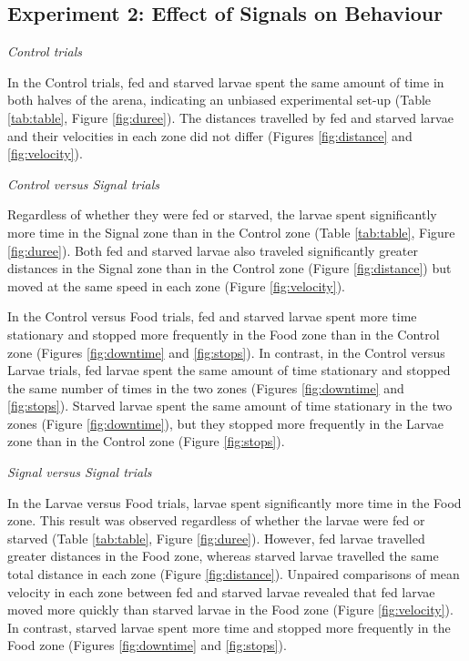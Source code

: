 
\subsection{Experiment 2: Effect of Signals on Behaviour}

\textit{Control trials}

In the Control trials, fed and starved larvae spent the same amount of time in both halves of the arena, indicating an unbiased experimental set-up (Table \ref{tab:table}, Figure \ref{fig:duree}). The distances travelled by fed and starved larvae and their velocities in each zone did not differ (Figures \ref{fig:distance} and \ref{fig:velocity}).

\textit{Control versus Signal trials}

Regardless of whether they were fed or starved, the larvae spent significantly more time in the Signal zone than in the Control zone (Table \ref{tab:table}, Figure \ref{fig:duree}). Both fed and starved larvae also traveled significantly greater distances in the Signal zone than in the Control zone (Figure \ref{fig:distance}) but moved at the same speed in each zone (Figure \ref{fig:velocity}).

In the Control versus Food trials, fed and starved larvae spent more time stationary and stopped more frequently in the Food zone than in the Control zone (Figures \ref{fig:downtime} and \ref{fig:stops}). In contrast, in the Control versus Larvae trials, fed larvae spent the same amount of time stationary and stopped the same number of times in the two zones (Figures \ref{fig:downtime} and \ref{fig:stops}). Starved larvae spent the same amount of time stationary in the two zones (Figure \ref{fig:downtime}), but they stopped more frequently in the Larvae zone than in the Control zone (Figure \ref{fig:stops}).

\clearpage


\textit{Signal versus Signal trials}

In the Larvae versus Food trials, larvae spent significantly more time in the Food zone. This result was observed regardless of whether the larvae were fed or starved (Table \ref{tab:table}, Figure \ref{fig:duree}). However, fed larvae travelled greater distances in the Food zone, whereas starved larvae travelled the same total distance in each zone (Figure \ref{fig:distance}). Unpaired comparisons of mean velocity in each zone between fed and starved larvae revealed that fed larvae moved more quickly than starved larvae in the Food zone (Figure \ref{fig:velocity}). In contrast, starved larvae spent more time and stopped more frequently in the Food zone (Figures \ref{fig:downtime} and \ref{fig:stops}).


